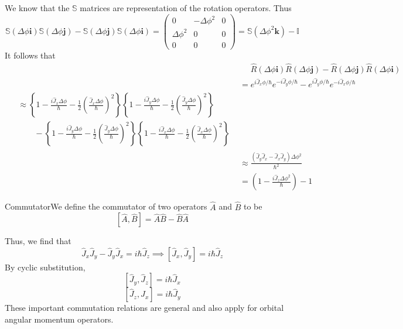 \documentclass{report}
\newcommand{\dfn}[2]{\begin{Definition}[colbacktitle=red!75!black]{#1}{}#2\end{Definition}}
\begin{document}
We know that the \(\mathbb S\) matrices are representation of the rotation operators. Thus
\[
\mathbb S ( \Delta \phi \mathbf i) \mathbb S (\Delta \phi \mathbf j) -\mathbb S ( \Delta \phi \mathbf j) \mathbb S (\Delta \phi \mathbf i) = \begin{pmatrix} 0 & - \Delta \phi ^2 & 0 \\ \Delta \phi ^2 & 0 & 0 \\ 0 & 0 & 0 \end{pmatrix} = \mathbb S (\Delta \phi ^2 \mathbf k) - \mathbb I
\]
It follows that 
\begin{align*}
&\mathrel{\phantom{=}} \hat R(\Delta \phi \mathbf i) \hat R(\Delta \phi \mathbf j) - \hat R(\Delta \phi \mathbf j)\hat R(\Delta \phi \mathbf i)\\
&=e^{i \hat J _x \phi / \hbar} e^{-i \hat J _y \phi / \hbar} - e^{i \hat J_y \phi / \hbar} e^{-i \hat J _x \phi / \hbar} \\
\begin{split}
&\approx \left\{ 1 - \frac{i \hat J_x \Delta \phi}{\hbar} - \frac{1}{2}\left(\frac{\hat J_x \Delta \phi}{\hbar}\right)^2\right\} \left\{ 1 - \frac{i \hat J_y \Delta \phi}{\hbar} - \frac{1}{2}\left(\frac{\hat J_y \Delta \phi}{\hbar}\right)^2\right\}\\
& \qquad - \left\{ 1 - \frac{i \hat J_y \Delta \phi}{\hbar} - \frac{1}{2}\left(\frac{\hat J_y \Delta \phi}{\hbar}\right)^2\right\} \left\{ 1 - \frac{i \hat J_x \Delta \phi}{\hbar} - \frac{1}{2}\left(\frac{\hat J_x \Delta \phi}{\hbar}\right)^2\right\} 
\end{split}\\
&\approx  \frac{(\hat J_y \hat J_x - \hat J_x \hat J_y)\Delta \phi^2 }{\hbar^2}\\
&= \left( 1 - \frac{i \hat J_z \Delta \phi ^2}{\hbar} \right) -1
\end{align*}
\dfn{Commutator}{We define the commutator of two operators \(\hat A\) and \(\hat B\) to be 
\[
 [ \hat A, \hat B ] = \hat A \hat B - \hat B \hat A
\]}
Thus, we find that \[
\hat J_x  \hat J_y - \hat J_y \hat J_x = i \hbar \hat J_z \implies [\hat J_x , \hat J_y ] = i \hbar \hat J_z
\] 
By cyclic substitution, 
\[
[\hat J_y, \hat J_z ] = i \hbar \hat J_x
\] 
\[
[\hat J_z, \hat J_x] = i \hbar \hat J_y
\] 
These important commutation relations are general and also apply for orbital angular momentum operators. 
\end{document}
